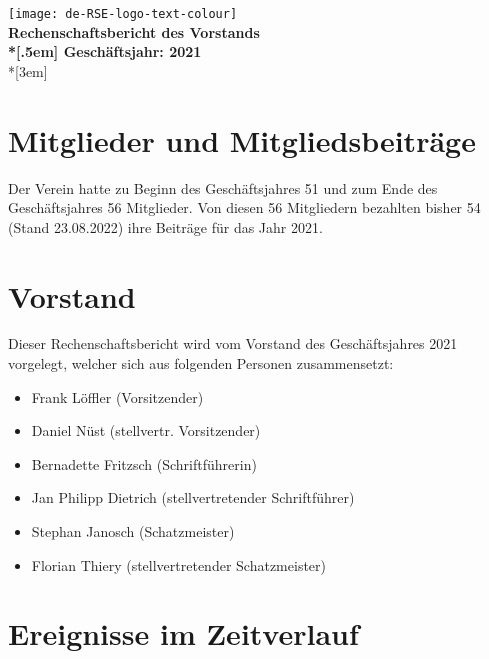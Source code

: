 \newcommand{\jahr}{2021}



\thispagestyle{empty}

\begin{centering}
\texttt{[image: de-RSE-logo-text-colour]}\\
\vspace{3em}
\textbf{
 \Large Rechenschaftsbericht des Vorstands\\*[.5em]
 \normalsize Geschäftsjahr: \jahr}\\*[3em]
\end{centering}

\section{Mitglieder und Mitgliedsbeiträge}

Der Verein hatte zu Beginn des Geschäftsjahres 51 und zum Ende des Geschäftsjahres 56 Mitglieder. Von diesen  56 Mitgliedern bezahlten bisher  54 (Stand 23.08.2022) ihre Beiträge für das Jahr 2021.

\section{Vorstand}

Dieser Rechenschaftsbericht wird vom Vorstand des Geschäftsjahres 2021 vorgelegt, welcher sich aus folgenden Personen zusammensetzt:

\begin{itemize}
  \setlength{\itemsep}{0pt plus 1pt}
  \item Frank Löffler (Vorsitzender)
  \item Daniel Nüst (stellvertr. Vorsitzender)
  \item Bernadette Fritzsch (Schriftführerin)
  \item Jan Philipp Dietrich (stellvertretender Schriftführer)
  \item Stephan Janosch (Schatzmeister)
  \item Florian Thiery (stellvertretender Schatzmeister)
\end{itemize}

\section{Ereignisse im Zeitverlauf}

